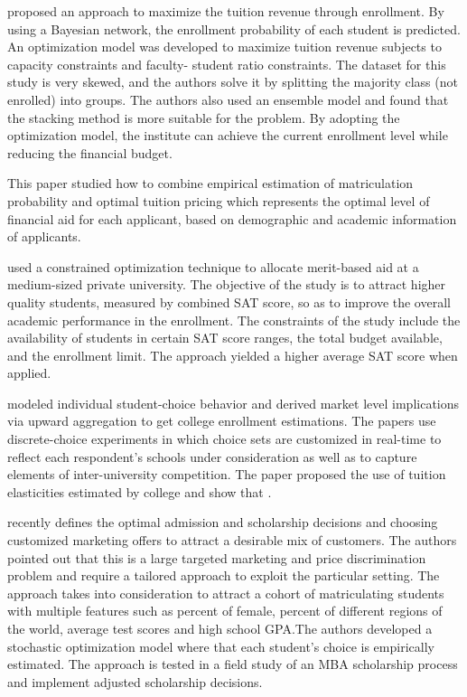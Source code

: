 \documentclass[12pt,english]{report}
\begin{document}
\citet{Thanh2007} proposed an approach to maximize the tuition revenue  through enrollment. By using a Bayesian network, the enrollment probability  of each student is predicted.  An optimization model was developed to  maximize  tuition revenue subjects to capacity constraints and faculty- student ratio constraints. The dataset for this study is very skewed, and the authors solve it by splitting the majority class (not enrolled) into groups. The authors  also used an ensemble model and found that the stacking method  is more  suitable for the problem. By adopting the optimization model, the institute  can achieve the current enrollment level while reducing the financial budget.

\citet{Bosshardt2010} This paper studied how to combine empirical estimation  of matriculation probability and optimal tuition pricing  which represents  the optimal level of financial aid for each applicant, based on demographic  and academic information of applicants.

\citet{Sugrue2010} used a constrained optimization technique to allocate merit-based aid at a medium-sized private university. The objective of the study is to attract higher quality students, measured by combined SAT score,  so as to improve the overall academic performance in the enrollment. The constraints of the study include the availability of students in certain SAT score ranges, the total budget available, and the enrollment limit. The approach yielded a higher average SAT score when applied.


\citet{Carter2011} modeled individual student-choice behavior and derived market level implications via upward aggregation to get college enrollment estimations. The papers use discrete-choice experiments in which choice sets are customized in real-time to reflect each respondent's  schools under consideration as well as to capture elements of inter-university competition.  The paper proposed the use of tuition elasticities estimated by college and show that .

\citet{Belloni2012} recently defines the optimal admission and scholarship decisions and choosing customized marketing offers to attract a desirable mix of customers.  The authors pointed out that this is a large targeted  marketing and price discrimination problem and require a tailored approach to exploit the particular setting.  The approach takes into consideration to attract a cohort of matriculating students with multiple features such as percent of female, percent of different regions of the world, average test scores and high school GPA.The authors developed a stochastic optimization model where that each student's choice is empirically estimated. The approach is tested in a field study of an MBA scholarship process and implement  adjusted scholarship decisions.
\end{document}
